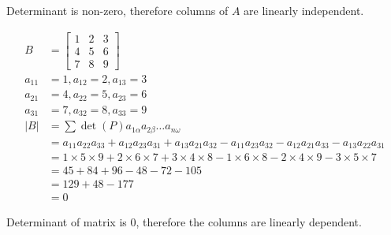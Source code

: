 \documentclass[main.tex]{subfiles}
\begin{document}
\begin{enumerate}
    Determinant is non-zero, therefore columns of $A$ are linearly independent.
    
    $$
    \begin{aligned}
    B&=\left[\begin{array}{lll}
    1 & 2 & 3 \\
    4 & 5 & 6 \\
    7 & 8 & 9
    \end{array}\right]\\
    a_{11}&=1, a_{12}=2, a_{13}=3 \\
    a_{21}&=4, a_{22}=5, a_{23}=6 \\
    a_{31}&=7, a_{32}=8, a_{33}=9 \\
    |B|&=\sum \operatorname{det}(P) a_{1 \alpha} a_{2 \beta} \ldots a_{n \omega}\\
    &=a_{11} a_{22} a_{33}+a_{12} a_{23} a_{31}+a_{13} a_{21} a_{32}-a_{11} a_{23} a_{32}-a_{12} a_{21} a_{33}-a_{13} a_{22} a_{31} \\
    &=1 \times 5 \times 9+2 \times 6 \times 7+3 \times 4 \times 8-1 \times 6 \times 8-2 \times 4 \times 9-3 \times 5 \times 7 \\
    &=45+84+96-48-72-105 \\
    &=129+48-177 \\
    &=0
    \end{aligned}
    $$
    
    Determinant of matrix is 0, therefore the columns are linearly dependent.
    

\end{enumerate}
\end{document}
